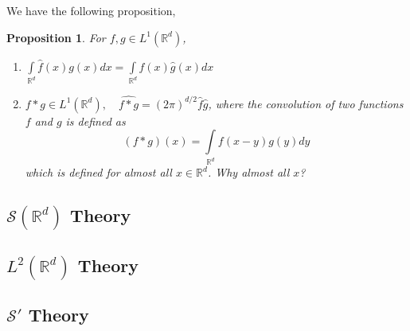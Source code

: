 \documentclass[letterpaper,twoside,12pt]{article}
\theoremstyle{mystyle}
\newtheorem{prop}{Proposition}[section]
\newcommand{\R}{{\mathbb R}}
\newcommand{\ScS}{\mathcal S}
\newcommand{\cbk}{\color{black}}
\newcommand{\cred}{\color{red}}
\begin{document}
We have the following proposition, 
\begin{prop}
  For $f, g\in L^1\left( \R^d \right)$, 
  \begin{enumerate}
    \item $\displaystyle\int\limits_{{\mathbb{R}^d}} {\hat f\left( x \right)g\left( x \right)dx}  = \int\limits_{{\mathbb{R}^d}} {f\left( x \right)\hat g\left( x \right)dx} $
    \item $f * g \in {L^1}\left( {{\mathbb{R}^d}} \right),\quad \widehat {f * g} = {\left( {2\pi } \right)^{d/2}}\hat f\hat g$, where the convolution of two functions $f$ and $g$ is defined as 
    \[\left( {f * g} \right)\left( x \right) = \int\limits_{{\mathbb{R}^d}} {f\left( {x - y} \right)g\left( y \right)dy} \]
    which is defined for almost all $x\in \R^d$. \cred Why almost all $x$? \cbk 
  \end{enumerate}
\end{prop}
































\subsection{$\mathcal S \left( \R^d \right)$ Theory}

\subsection{$L^2\left( \R^d \right)$ Theory}

\subsection{$\ScS'$ Theory}
\end{document}

